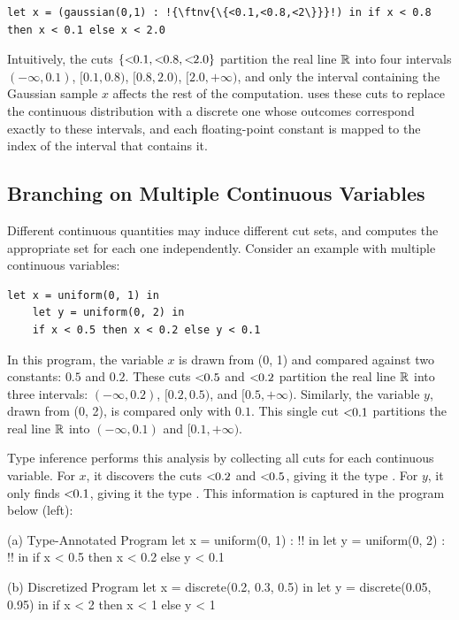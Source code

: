 \begin{lstlisting}[aboveskip=1em,belowskip=1em,escapechar=!,gobble=4]
    let x = (gaussian(0,1) : !{\ftnv{\{<0.1,<0.8,<2\}}}!) in if x < 0.8 then x < 0.1 else x < 2.0
\end{lstlisting}

\noindent Intuitively, the cuts $\{<\!\!{0.1}, <\!\!{0.8}, <\!\!{2.0}\}$ partition the real line $\mathbb{R}$ into four intervals $(-\infty, 0.1)$, $[0.1, 0.8)$, $[0.8, 2.0)$, $[2.0, +\infty)$, and only the interval containing the Gaussian sample $x$ affects the rest of the computation. \Slice{} uses these cuts to replace the continuous distribution with a discrete one whose outcomes correspond exactly to these intervals, and each floating-point constant is mapped to the index of the interval that contains it.

\subsection{Branching on Multiple Continuous Variables}\label{sec:examples:2}

\noindent Different continuous quantities may induce different cut sets, and \Slice{} computes the appropriate set for each one independently. Consider an example with multiple continuous variables:

\begin{lstlisting}[aboveskip=1em,belowskip=1em,gobble=4]
    let x = uniform(0, 1) in
    let y = uniform(0, 2) in
    if x < 0.5 then x < 0.2 else y < 0.1
\end{lstlisting}

\noindent In this program, the variable $x$ is drawn from \uniform(0, 1) and compared against two constants: $0.5$ and $0.2$. These cuts $<\!\!{0.5}$ and $<\!\!{0.2}$ partition the real line $\mathbb{R}$ into three intervals: $(-\infty, 0.2)$, $[0.2, 0.5)$, and $[0.5, +\infty)$. Similarly, the variable $y$, drawn from \uniform(0, 2), is compared only with $0.1$. This single cut $<\!\!{0.1}$ partitions the real line $\mathbb{R}$ into $(-\infty, 0.1)$ and $[0.1, +\infty)$.

Type inference performs this analysis by collecting all cuts for each continuous variable. For $x$, it discovers the cuts $<\!\!{0.2}$ and $<\!\!{0.5}$, giving it the type . For $y$, it only finds $<\!\!{0.1}$, giving it the type . This information is captured in the program below (left):

\begin{tcbraster}[
    raster columns=2,
    raster equal height=rows,
    raster before skip=1.5em,
    raster after skip=1.5em,
    raster column skip=0.8em]
    \begin{programpanel}{(a) Type-Annotated Program}
let x = uniform(0, 1) : !{}! in
let y = uniform(0, 2) : !{}! in
if x < 0.5 then x < 0.2 else y < 0.1
    \end{programpanel}
    \begin{programpanel}{(b) Discretized Program}
let x = discrete(0.2, 0.3, 0.5) in
let y = discrete(0.05, 0.95) in
if x < 2 then x < 1 else y < 1
    \end{programpanel}
\end{tcbraster}
\label{fig:examples:2}


